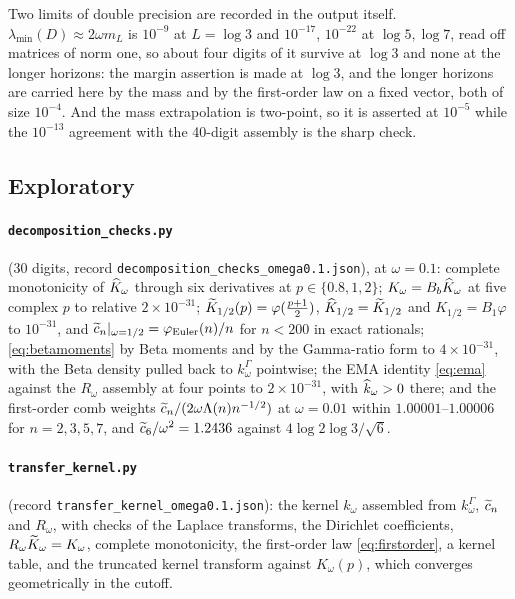 Two limits of double precision are recorded in the output itself.
$\lambda_{\min}(D)\approx2\omega m_L$ is $10^{-9}$ at $L=\log3$ and $10^{-17}$,
$10^{-22}$ at $\log5,\log7$, read off matrices of norm one, so about four digits
of it survive at $\log3$ and none at the longer horizons: the margin assertion
is made at $\log3$, and the longer horizons are carried here by the mass and by
the first-order law on a fixed vector, both of size $10^{-4}$. And the mass
extrapolation is two-point, so it is asserted at $10^{-5}$ while the $10^{-13}$
agreement with the 40-digit assembly is the sharp check.

\subsection*{Exploratory}

\paragraph{\texttt{decomposition\_checks.py}} (30 digits, record
\texttt{decomposition\_checks\_omega0.1.json}), at $\omega=0.1$: complete
monotonicity of $\widehat K_\omega$ through six derivatives at $p\in\{0.8,1,2\}$;
$K_\omega=B_b\widehat K_\omega$ at five complex $p$ to relative $2\times10^{-31}$;
$\widetilde K_{1/2}(p)=\varphi(\frac{p+1}2)$, $\widehat K_{1/2}=\widetilde K_{1/2}$ and $K_{1/2}=B_1\varphi$
to $10^{-31}$, and $\widetilde c_n|_{\omega=1/2}=\varphi_{\mathrm{Euler}}(n)/n$ for
$n<200$ in exact rationals; \eqref{eq:betamoments} by Beta moments and by the
Gamma-ratio form to $4\times10^{-31}$, with the Beta density pulled back to
$k^\Gamma_\omega$ pointwise; the EMA identity \eqref{eq:ema} against the
$R_\omega$ assembly at four points to $2\times10^{-31}$, with $\widehat k_\omega>0$
there; and the first-order comb weights $\widetilde c_n/(2\omega\Lambda(n)n^{-1/2})$ at
$\omega=0.01$ within $1.00001$--$1.00006$ for $n=2,3,5,7$, and
$\widetilde c_6/\omega^2=1.2436$ against $4\log2\log3/\sqrt6$.

\paragraph{\texttt{transfer\_kernel.py}} (record
\texttt{transfer\_kernel\_omega0.1.json}): the kernel $k_\omega$ assembled from
$k^\Gamma_\omega$, $\widetilde c_n$ and $R_\omega$, with checks of the Laplace
transforms, the Dirichlet coefficients, $R_\omega\widetilde K_\omega=K_\omega$, complete
monotonicity, the first-order law \eqref{eq:firstorder}, a kernel table, and
the truncated kernel transform against $K_\omega(p)$, which converges
geometrically in the cutoff.

